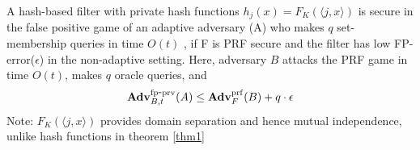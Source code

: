 \newcommand{\FK}{F_K(\langle j,x \rangle)}
\newcommand{\rhoK}{\rho(\langle j,x \rangle)}

\begin{theorem}\label{thm2}
A hash-based filter with private hash functions $h_j(x) = \FK$ is secure in the false positive game of an adaptive adversary (A) who makes $q$ set-membership queries in time $O(t)$ , if F is PRF secure and the filter has low FP-error($\epsilon$) in the non-adaptive setting. Here, adversary $B$ attacks the PRF game in time $O(t)$, makes $q$ oracle queries, and 
\begin{equation}
\mathrm{\mathbf{Adv}}^{\mathrm{fp\mbox{-}prv}}_{B,t}(A) \leq  \mathbf{Adv}^{\mathrm{prf}}_{F}(B) + q \cdot \epsilon
\end{equation}
Note: $\FK$ provides domain separation and hence mutual independence, unlike hash functions in theorem \ref{thm1}
\end{theorem}

